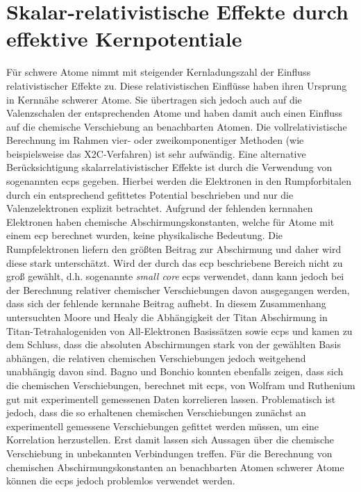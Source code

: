 \section{Skalar-relativistische Effekte durch effektive Kernpotentiale}\label{kap:ecps}
Für schwere Atome nimmt mit steigender Kernladungszahl der Einfluss relativistischer Effekte zu. Diese relativistischen Einflüsse haben ihren Ursprung in Kernnähe schwerer Atome. Sie übertragen sich jedoch auch auf die Valenzschalen der entsprechenden Atome und haben damit auch einen Einfluss auf die chemische Verschiebung an benachbarten Atomen. Die vollrelativistische Berechnung im Rahmen vier- oder zweikomponentiger Methoden (wie beispielsweise das X2C-Verfahren) ist sehr aufwändig. Eine alternative Berücksichtigung skalarrelativistischer Effekte ist durch die Verwendung von sogenannten \acfp{ecp}\supercite{cundari1996effective,frenking2007pseudopotential} gegeben. Hierbei werden die Elektronen in den Rumpforbitalen durch ein entsprechend gefittetes Potential beschrieben und nur die Valenzelektronen explizit betrachtet. Aufgrund der fehlenden kernnahen Elektronen haben chemische Abschirmungskonstanten, welche für Atome mit einem \ac{ecp} berechnet wurden, keine physikalische Bedeutung. Die Rumpfelektronen liefern den größten Beitrag zur Abschirmung und daher wird diese stark unterschätzt. Wird der durch das \ac{ecp} beschriebene Bereich nicht zu groß gewählt, d.h. sogenannte \textit{small core} \acp{ecp} verwendet, dann kann jedoch bei der Berechnung relativer chemischer Verschiebungen davon ausgegangen werden, dass sich der fehlende kernnahe Beitrag aufhebt.\supercite{van2012use} In diesem Zusammenhang untersuchten Moore und Healy\supercite{moore1995ab} die Abhängigkeit der Titan Abschirmung in Titan-Tetrahalogeniden von All-Elektronen Basissätzen sowie \acp{ecp} und kamen zu dem Schluss, dass die absoluten Abschirmungen stark von der gewählten Basis abhängen, die relativen chemischen Verschiebungen jedoch weitgehend unabhängig davon sind. Bagno und Bonchio konnten ebenfalls zeigen, dass sich die chemischen Verschiebungen, berechnet mit \acp{ecp}, von Wolfram\supercite{bagno2000effective} und Ruthenium\supercite{bagno2002dft} gut mit experimentell gemessenen Daten korrelieren lassen. Problematisch ist jedoch, dass die so erhaltenen chemischen Verschiebungen zunächst an experimentell gemessene Verschiebungen gefittet werden müssen, um eine Korrelation herzustellen. Erst damit lassen sich Aussagen über die chemische Verschiebung in unbekannten Verbindungen treffen. Für die Berechnung von chemischen Abschirmungskonstanten an benachbarten Atomen schwerer Atome können die \acp{ecp} jedoch problemlos verwendet werden.
